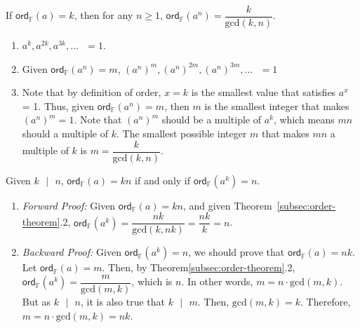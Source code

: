 \begin{tcolorbox}[title={\textbf{\tboxtheorem{\ref*{subsec:order-theorem}.2} Order Property (II)}}]
If $\textsf{ord}_\mathbb{F}(a) = k$, then for any $n \geq 1$, $\textsf{ord}_\mathbb{F}(a^n) = \dfrac{k} {\text{gcd}(k, n)}$.
\end{tcolorbox}
\begin{myproof}
    \begin{enumerate}
    \item $a^k, a^{2k}, a^{3k}, ... \text{ } = 1$. 
    \item Given $\textsf{ord}_\mathbb{F}(a^n) = m$, $(a^n)^m, (a^n)^{2m}, (a^n)^{3m}, ... \text{ } = 1$ 
    \item Note that by definition of order, $x=k$ is the smallest value that satisfies $a^x$ = 1. Thus, given $\textsf{ord}_\mathbb{F}(a^n) = m$, then $m$ is the smallest integer that makes $(a^n)^m = 1$. Note that $(a^n)^m$ should be a multiple of $a^k$, which means $mn$ should a multiple of $k$. The smallest possible integer $m$ that makes $mn$ a multiple of $k$ is $m = \dfrac{k}{\text{gcd}(k, n)}$. 
    \end{enumerate}
\end{myproof}

\begin{tcolorbox}[title={\textbf{\tboxtheorem{\ref*{subsec:order-theorem}.3} Order Property (III)}}]
Given $k \text{ } | \text{ } n$, $\textsf{ord}_\mathbb{F}(a) = kn$ if and only if $\textsf{ord}_\mathbb{F}(a^k) = n$.
\end{tcolorbox}
\begin{myproof}
\begin{enumerate}
    \item \textit{Forward Proof:} Given $\textsf{ord}_\mathbb{F}(a) = kn$, and given Theorem~\ref*{subsec:order-theorem}.2, $\textsf{ord}_\mathbb{F}(a^k) = \dfrac{nk}{\text{gcd}(k, nk)} = \dfrac{nk}{k} = n$.
    \item \textit{Backward Proof:} Given $\textsf{ord}_\mathbb{F}(a^k) = n$, we should prove that $\textsf{ord}_\mathbb{F}(a) = nk$. Let $\textsf{ord}_\mathbb{F}(a) = m$. Then, by Theorem\ref*{subsec:order-theorem}.2, $\textsf{ord}_\mathbb{F}(a^k) = \dfrac{m}{\text{gcd}(m, k)}$, which is $n$. In other words, $m = n \cdot \text{gcd}(m, k)$. But as $k \text{ } | \text{ } n$, it is also true that $k \text{ } | \text{ } m$. Then, $\text{gcd}(m, k) = k$. Therefore, $m = n \cdot \text{gcd}(m, k) = nk$.
\end{enumerate}
\end{myproof}

